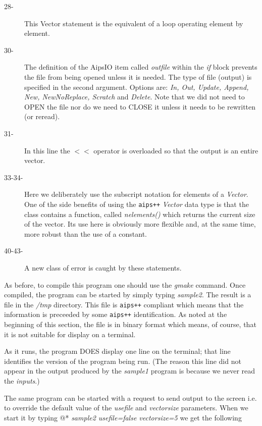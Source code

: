 \begin{description}
\item[28-] This Vector statement is the equivalent of a loop operating element by
element.

\item[30-] The definition of the AipsIO item called {\em outfile} within the
{\em if} block prevents the file from being opened unless it is needed.
The type of file (output) is specified in the second argument.  Options
are: {\em  In, Out, Update, Append, New, NewNoReplace, Scratch} and
{\em Delete}.  Note that we did not need to OPEN the file nor do we need to
CLOSE it unless it needs to be rewritten (or reread).  

\item[31-] In this line the {\em $<<$} operator is overloaded so that the output
is an entire vector.
  
\item[33-34-] Here we deliberately use the subscript notation for elements of a 
{\em Vector}. 
 One of the side benefits of using the {\tt aips++} {\em Vector} data type
is that the class contains a function, called {\em nelements()} which
returns the current size of the vector. Its use here is obviously more
flexible and, at the same time, more robust than the use of a constant.

\item[40-43-] A new class of error is caught by these statements.
\end{description}

As before, to compile this program one should use the {\em gmake}
command. Once compiled, the program can be started by simply typing
{\em sample2}. The result is a file in the {\em /tmp} directory.  This
file is {\tt aips++} compliant which means that the information is preceeded
by some {\tt aips++} identification. As noted at the beginning of this section,
the file is in binary format which means, of course, that it is not
suitable for display on a terminal.

  As it runs, the program DOES
display one line on the terminal; that line identifies the version of
the program being run. (The reason this line did not appear in the output
produced by the {\em sample1} program is because we never read the
{\em inputs}.) 

The same program can be started with a request to send output to the
screen i.e. to override the default value of the {\em usefile}
and {\em vectorsize} parameters. When we start it by typing
@*
{\em sample2 usefile=false vectorsize=5} we get the following

